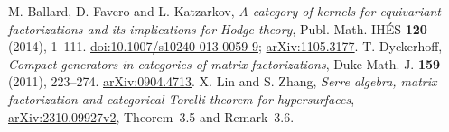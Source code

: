 M. Ballard, D. Favero and L. Katzarkov,
\emph{A category of kernels for equivariant factorizations and its implications for Hodge theory},
Publ. Math. IH\'ES \textbf{120} (2014), 1--111.
\href{https://doi.org/10.1007/s10240-013-0059-9}{doi:10.1007/s10240-013-0059-9};
\href{https://arxiv.org/abs/1105.3177}{arXiv:1105.3177}.
T. Dyckerhoff,
\emph{Compact generators in categories of matrix factorizations},
Duke Math. J. \textbf{159} (2011), 223--274.
\href{https://arxiv.org/abs/0904.4713}{arXiv:0904.4713}.
X. Lin and S. Zhang,
\emph{Serre algebra, matrix factorization and categorical Torelli theorem for hypersurfaces},
\href{https://arxiv.org/html/2310.09927v2}{arXiv:2310.09927v2},
Theorem~3.5 and Remark~3.6.
